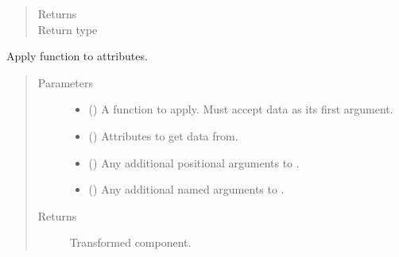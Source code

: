 \documentclass[letterpaper,10pt,english]{sphinxmanual}
\begin{document}
\begin{fulllineitems}
\begin{fulllineitems}
\begin{quote}
\begin{description}
\item[{Returns}] \leavevmode
{}

\item[{Return type}] \leavevmode
{\hyperref[\detokenize{api/wells:geology.src.wells.Wells}]{}}

\end{description}\end{quote}

\end{fulllineitems}


\begin{fulllineitems}
\label{\detokenize{api/wells:geology.src.wells.Wells.apply}}
Apply function to attributes.
\begin{quote}\begin{description}
\item[{Parameters}] \leavevmode\begin{itemize}
\item {} 
 () \textendash{} A function to apply. Must accept data as its first argument.

\item {} 
 (\sphinxstyleliteralemphasis{\sphinxupquote{, }}) \textendash{} Attributes to get data from.

\item {} 
 () \textendash{} Any additional positional arguments to .

\item {} 
 () \textendash{} Any additional named arguments to .

\end{itemize}

\item[{Returns}] \leavevmode
{} \textendash{} Transformed component.


\end{description}
\end{quote}
\end{fulllineitems}
\end{fulllineitems}
\end{document}
